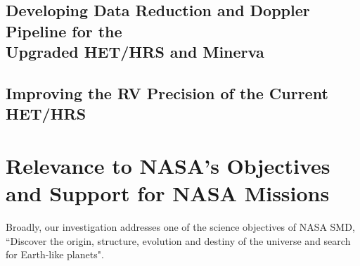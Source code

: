 \documentclass[12pt]{article}
\def\hrs{HET/HRS}
\begin{document}
\subsection{Developing Data Reduction and Doppler Pipeline for the \\
  Upgraded HET/HRS and Minerva}\label{develop} 

\vspace{-3pt}
\subsection{Improving the RV Precision of the Current HET/HRS}

\begin{comment}
\begin{wrapfigure}{r}{0.51\textwidth}
  \vspace{-35pt}
  \begin{center}
    \texttt{[image: 37605]}
  \end{center}
  \vspace{-25pt}  
  \caption{Best Keplerian fit for the HD 37605 system (top panel:
    solid line) and the velocity residuals (bottom panel). We
    discovered HD 37605$c$ using \hrs\ data spanning $\sim$8 years
    (black dots) and also RVs from Keck and McDonald Observatory 2.1m
    telescope, but only \hrs\ data are shown here to highlight its
    precision and time baseline \citep{wang2012}. The bottom panel
    shows that the amplitude of the RV residuals decreased after the
    fine temperature control for the spectrograph room came online
    (epoch marked by dash-dotted line). The heights of the two grey
    regions are the RMS values before and after (9 and 6 m/s,
    respectively).}
  \vspace{-8pt}  
  \label{fit}
\end{wrapfigure}
\end{comment}


 
\vspace{-3pt}
\section{Relevance to NASA's Objectives and Support for NASA Missions}

Broadly, our investigation addresses one of the science
objectives of NASA SMD, ``Discover the origin, structure, evolution
and destiny of the universe and search for Earth-like planets".
\end{document}
